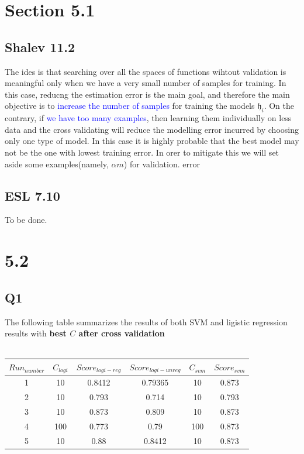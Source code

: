 \section{Section 5.1}
\subsection{Shalev 11.2}
The ides is that searching over all the spaces of functions wihtout validation is meaningful only when we have a very small number of samples for training.
In this case, reducng the estimation error is the main goal, and therefore the main objective is to \textcolor{blue}{increase the number of samples }for training the 
models $\mathfrak{h}_i$. On the contrary, if \textcolor{blue}{we have too many examples}, then learning them individually on less data and the cross validating will reduce the modelling
error incurred by choosing only one type of model. In this case it is highly probable that the best model may not be the one with lowest training error. In orer to mitigate this
we will set aside some examples(namely, $\alpha m$) for validation. 
error

\subsection{ESL 7.10}
To be done.


\section{5.2}
\subsection{Q1}
The following table summarizes the results of both SVM and ligistic regression results with \textbf{best $C$ after cross validation}
\\
\\
\begin{tabular}{c | c | c | c | c | c }
    $Run_{number}$  & $C_{logi}$ & $Score_{logi-reg}$  & $Score_{logi-unreg}$ & $C_{svm}$ & $Score_{svm}$
     \\ \hline
    1 & 10 & 0.8412 & 0.79365 & 10 & 0.873
     \\ \hline
    2 & 10 & 0.793 & 0.714 & 10 & 0.793
     \\ \hline
    3 & 10 & 0.873 & 0.809 & 10 & 0.873
    \\ \hline
    4 & 100 & 0.773 & 0.79 & 100 & 0.873
    \\ \hline
    5 & 10 & 0.88 & 0.8412 & 10 & 0.873
    \\ \hline
\end{tabular}
\newpage
